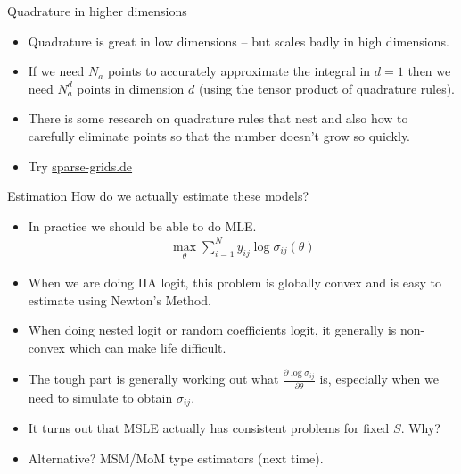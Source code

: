 \documentclass[aspectratio=169,11pt]{beamer}
\begin{document}
\begin{frame}{Quadrature in higher dimensions}
\begin{itemize}
\item Quadrature is great in low dimensions -- but scales badly in high dimensions.
\item If we need $N_a$ points to accurately approximate the integral in $d=1$ then we need $N_a^d$ points in dimension $d$ (using the tensor product of quadrature rules).
\item There is some research on quadrature rules that nest and also how to carefully eliminate points so that the number doesn't grow so quickly.
\item Try \url{sparse-grids.de}
\end{itemize}
\end{frame}

\begin{frame}{Estimation}
How do we actually estimate these models?
\begin{itemize}
\item In practice we should be able to do MLE.
\begin{eqnarray*}
\max_{\theta} \sum_{i=1}^N y_{ij} \log \sigma_{ij}(\theta)
\end{eqnarray*}
\item When we are doing IIA logit, this problem is globally convex and is easy to estimate using Newton's Method.
\item When doing nested logit or random coefficients logit, it generally is non-convex which can make life difficult.
\item The tough part is generally working out what $\frac{\partial \log \sigma_{ij}}{\partial \theta}$ is, especially when we need to simulate to obtain $\sigma_{ij}$.
\item It turns out that MSLE actually has consistent problems for fixed $S$. Why?
\item Alternative? MSM/MoM type estimators (next time).
\end{itemize}
\end{frame}




\end{document}
